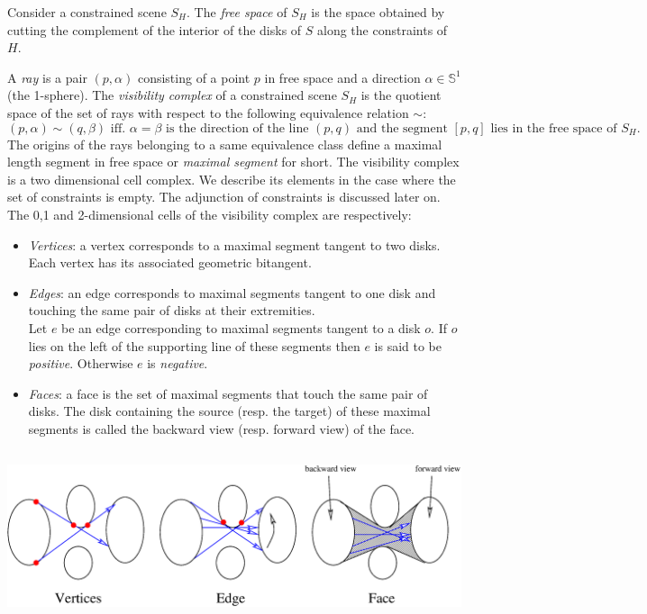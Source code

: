 Consider a constrained scene $S_H$. The \emph{free space} of $S_H$ is the
space obtained by cutting the complement of the interior of the disks of $S$
along the constraints of $H$.

A \emph{ray} is a pair $(p,\alpha)$ consisting of a point $p$ in free space and
a direction $\alpha \in \mathbb{S}^1$ (the 1-sphere).  The \emph{visibility
complex} of a constrained scene $S_H$ is the quotient space of the set of rays
with respect to the following equivalence relation $\sim$:
\begin{equation}
(p,\alpha) \sim (q,\beta) \textrm{ iff. } \alpha = \beta \textrm{ is the
direction of the line $(p,q)$ and the segment } [p,q] \textrm{ lies in the free
space of } S_H.
\end{equation}
The origins of the rays belonging to a same equivalence class define a maximal
length segment in free space or \emph{maximal segment} for short.  The
visibility complex is a two dimensional cell complex. We describe its elements
in the case where the set of constraints is empty. The adjunction of constraints
is discussed later on. The 0,1 and 2-dimensional cells of the visibility complex
are respectively:
\begin{itemize}
    \item \emph{Vertices}: a vertex corresponds to a maximal segment tangent to
    two disks. Each vertex has its associated geometric bitangent.
    \item \emph{Edges}: an edge corresponds to maximal segments tangent to one
    disk and touching the same pair of disks at their extremities. \\
    Let $e$ be an edge corresponding to maximal segments tangent to a disk $o$.
    If $o$ lies on the left of the supporting line of these segments then $e$ is
    said to be \emph{positive}. Otherwise $e$ is \emph{negative}.
    \item \emph{Faces}: a face is the set of maximal segments that touch the
    same pair of disks. The disk containing the source (resp. the target) of 
    these maximal segments is called the backward view (resp. forward view) of 
    the face.
\end{itemize}

\begin{ccTexOnly}
    \begin{center}
        \includegraphics[height=5cm,width=\linewidth]{fig/vis-complex.eps}%
    \end{center}
\end{ccTexOnly}

